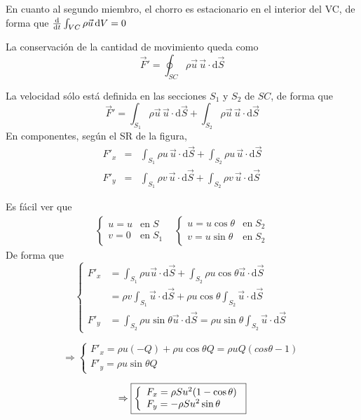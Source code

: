 		En cuanto al segundo miembro, el chorro es estacionario en el interior
		del VC, de forma que $\frac{\textrm{d} \phantom{}}{\textrm{d} t}\int_{VC}\rho\vec{u}\,\text{d}V=0$
		
		La conservación de la cantidad de movimiento queda como 
		\[
		\vec{F}'=\oint_{SC}\rho\vec{u}\,\vec{u}\cdot\text{d}\vec{S}
		\]
		
		La velocidad sólo está definida en las secciones $S_{1}$ y $S_{2}$
		de $SC$, de forma que 
		\[
		\vec{F}'=\int_{S_{1}}\rho\vec{u}\,\vec{u}\cdot\text{d}\vec{S}+\int_{S_{2}}\rho\vec{u}\,\vec{u}\cdot\text{d}\vec{S}
		\]
		En componentes, según el SR de la figura, 
		\begin{eqnarray*}
			F'_{x} & = & \int_{S_{1}}\rho u\,\vec{u}\cdot\text{d}\vec{S}+\int_{S_{2}}\rho u\,\vec{u}\cdot\text{d}\vec{S}\\
			F'_{y} & = & \int_{S_{1}}\rho v\,\vec{u}\cdot\text{d}\vec{S}+\int_{S_{2}}\rho v\,\vec{u}\cdot\text{d}\vec{S}
		\end{eqnarray*}

	
		Es fácil ver que 
		\[
		\begin{array}{cc}
			\begin{cases}
				u=u & \text{en}\;S\\
				v=0 & \text{en}\;S_{1}
			\end{cases} & \begin{cases}
				u=u\cos\theta & \text{en}\;S_{2}\\
				v=u\sin\theta & \text{en}\;S_{2}
		\end{cases}\end{array}
		\]
		De forma que 
		\[
		\left\{ \begin{array}{ll}
			F'_{x} & =\int_{S_{1}}\rho u\vec{u}\cdot\text{d}\vec{S}+\int_{S_{2}}\rho u\cos\theta\vec{u}\cdot\text{d}\vec{S}\\
			& =\rho v\int_{S_{1}}\vec{u}\cdot\text{d}\vec{S}+\rho u\cos\theta\int_{S_{2}}\vec{u}\cdot\text{d}\vec{S}\\
			F'_{y} & =\int_{S_{2}}\rho u\sin\theta\vec{u}\cdot\text{d}\vec{S}=\rho u\sin\theta\int_{S_{2}}\vec{u}\cdot\text{d}\vec{S}
		\end{array}\right.
		\]
		
		\[
		\Rightarrow\left\{ \begin{array}{l}
			F'_{x}=\rho u(-Q)+\rho u\cos\theta Q=\rho uQ(cos\theta-1)\\
			F'_{y}=\rho u\sin\theta Q
		\end{array}\right.
		\]
		
		\[
		\Rightarrow\fbox{\ensuremath{\left\{  \begin{array}{l}
					F_{x}=\rho Su^{2}(1-\cos\theta)\\
					F_{y}=-\rho Su^{2}\sin\theta
				\end{array}\right.}}
		\]

